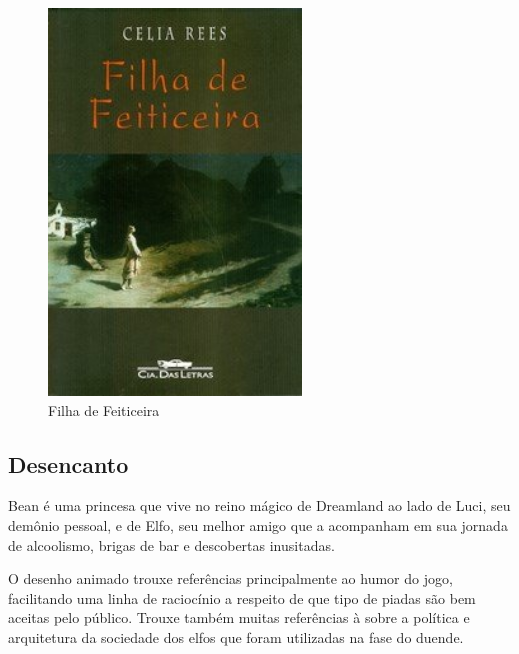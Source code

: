 \begin{figure}[!htb] \caption{\label{filha_feiticeira}Filha de Feiticeira}
    \begin{center}
    \includegraphics[width=0.6\textwidth]{imagens/feiticeira.jpeg} \end{center}
 \end{figure}

\clearpage

\subsection{Desencanto}

Bean é uma princesa que vive no reino mágico de Dreamland ao lado de Luci, seu demônio pessoal, e de Elfo, seu melhor amigo que a acompanham em sua jornada de alcoolismo, brigas de bar e descobertas inusitadas.

O desenho animado trouxe referências principalmente ao humor do jogo, facilitando uma linha de raciocínio a respeito de que tipo de piadas são bem aceitas pelo público. Trouxe também muitas referências à sobre a política e arquitetura da sociedade dos elfos que foram utilizadas na fase do duende.



